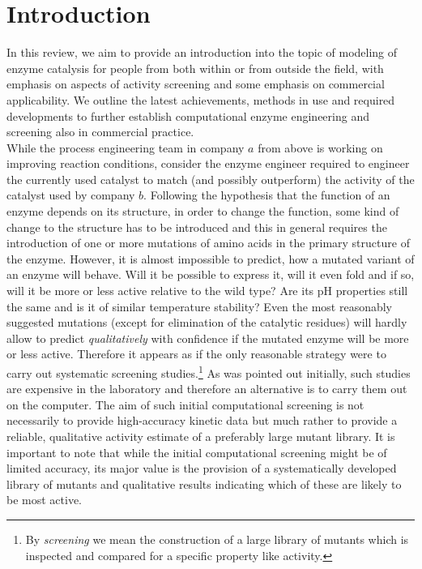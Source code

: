 \section{Introduction}\label{sec:intro}
In this review, we aim to provide an introduction into the topic of modeling of enzyme catalysis for people from both within or from outside the field, with emphasis on aspects of activity screening and some emphasis on commercial applicability.
We outline the latest achievements, methods in use and required developments to further establish computational enzyme engineering and screening also in commercial practice.\\
While the process engineering team in company $a$ from above is working on improving reaction conditions, consider the enzyme engineer required to engineer the currently used catalyst to match (and possibly outperform) the activity of the catalyst used by company $b$.
Following the hypothesis that the function of an enzyme depends on its structure, in order to change the function, some kind of change to the structure has to be introduced and this in general requires the introduction of one or more mutations of amino acids in the primary structure of the enzyme.
However, it is almost impossible to predict, how a mutated variant of an enzyme will behave.
Will it be possible to express it, will it even fold and if so, will it be more or less active relative to the wild type?
Are its pH properties still the same and is it of similar temperature stability?
Even the most reasonably suggested mutations (except for elimination of the catalytic residues) will hardly allow to predict \textit{qualitatively} with confidence if the mutated enzyme will be more or less active.
Therefore it appears as if the only reasonable strategy were to carry out systematic screening studies.\footnote{By \textit{screening} we mean the construction of a large library of mutants which is inspected and compared for a specific property like activity.}
As was pointed out initially, such studies are expensive in the laboratory and therefore an alternative is to carry them out on the computer.
The aim of such initial computational screening is not necessarily to provide high-accuracy kinetic data but much rather to provide a reliable, qualitative activity estimate of a preferably large mutant library.
It is important to note that while the initial computational screening might be of limited accuracy, its major value is the provision of a systematically developed library of mutants and qualitative results indicating which of these are likely to be most active.
